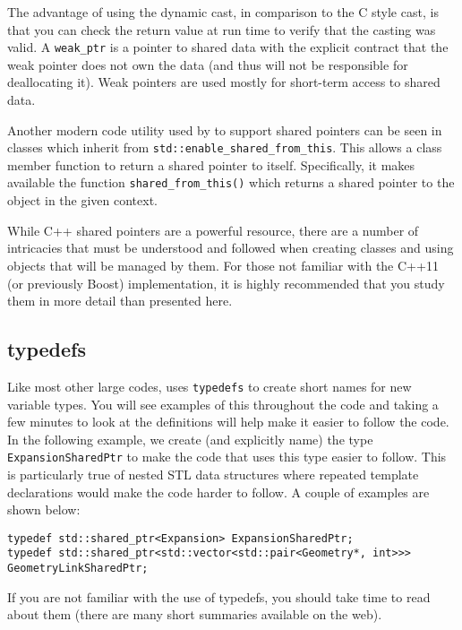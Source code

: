 The advantage of using the dynamic cast, in comparison to the C style
cast, is that you can check the return value at run time to verify
that the casting was valid.  A \lstinline|weak_ptr| is a pointer to shared
data with the explicit contract that the weak pointer does not own
the data (and thus will not be responsible for deallocating it).
Weak pointers are used mostly for short-term access to shared data.

Another modern code utility used by {\nek} to support shared
pointers can be seen in {\nek} classes which inherit from
\lstinline|std::enable_shared_from_this|. This allows a class member function to return a shared pointer to itself. Specifically, it makes available the function \lstinline|shared_from_this()| which returns a shared pointer to the object in the given context.

While C++ shared pointers are a powerful resource, there are a
number of intricacies that must be understood and followed when
creating classes and using objects that will be managed by them.
For those not familiar with the C++11 (or previously Boost)
implementation, it is highly recommended that you study them in more
detail than presented here.
  
\subsection{typedefs}
Like most other large codes, {\nek} uses
\lstinline{typedefs} to create short names for new variable types.  You will
see examples of this throughout the code and taking a few minutes to
look at the definitions will help make it easier to follow the code.
In the following example, we create (and explicitly name) the type
\lstinline{ExpansionSharedPtr} to make the code that uses this type easier
to follow. This is particularly true of nested STL data structures where repeated template declarations would make the code harder to follow. A couple of examples are shown below:
\begin{lstlisting}
typedef std::shared_ptr<Expansion> ExpansionSharedPtr;
typedef std::shared_ptr<std::vector<std::pair<Geometry*, int>>>
GeometryLinkSharedPtr;
\end{lstlisting}
If you are not familiar with the use of typedefs, you should take
time to read about them (there are many short summaries
available on the web).

